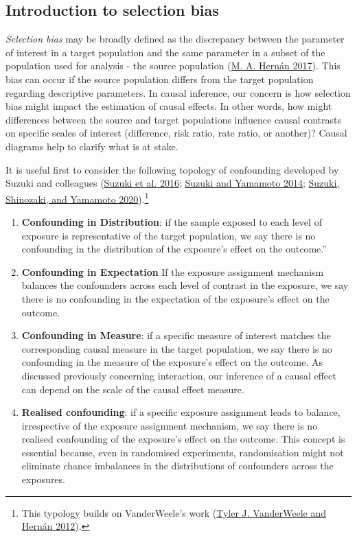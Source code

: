 \documentclass[
  singlecolumn]{report}
\begin{document}
\hypertarget{introduction-to-selection-bias}{%
\subsection{Introduction to selection
bias}\label{introduction-to-selection-bias}}

\emph{Selection bias} may be broadly defined as the discrepancy between
the parameter of interest in a target population and the same parameter
in a subset of the population used for analysis - the source population
(\protect\hyperlink{ref-hernuxe1n2017}{M. A. Hernán 2017}). This bias
can occur if the source population differs from the target population
regarding descriptive parameters. In causal inference, our concern is
how selection bias might impact the estimation of causal effects. In
other words, how might differences between the source and target
populations influence causal contrasts on specific scales of interest
(difference, risk ratio, rate ratio, or another)? Causal diagrams help
to clarify what is at stake.

It is useful first to consider the following topology of confounding
developed by Suzuki and colleagues
(\protect\hyperlink{ref-suzuki2016}{Suzuki et al. 2016};
\protect\hyperlink{ref-suzuki2014}{Suzuki and Yamamoto 2014};
\protect\hyperlink{ref-suzuki2020}{Suzuki, Shinozaki, and Yamamoto
2020}).\footnote{This typology builds on VanderWeele's work
  (\protect\hyperlink{ref-vanderweele2012}{Tyler J. VanderWeele and
  Hernán 2012}).}

\begin{enumerate}
\def\labelenumi{\arabic{enumi}.}
\item
  \textbf{Confounding in Distribution}: if the sample exposed to each
  level of exposure is representative of the target population, we say
  there is no confounding in the distribution of the exposure's effect
  on the outcome.''
\item
  \textbf{Confounding in Expectation} If the exposure assignment
  mechanism balances the confounders across each level of contrast in
  the exposure, we say there is no confounding in the expectation of the
  exposure's effect on the outcome.
\item
  \textbf{Confounding in Measure}: if a specific measure of interest
  matches the corresponding causal measure in the target population, we
  say there is no confounding in the measure of the exposure's effect on
  the outcome. As discussed previously concerning interaction, our
  inference of a causal effect can depend on the scale of the causal
  effect measure.
\item
  \textbf{Realised confounding}: if a specific exposure assignment leads
  to balance, irrespective of the exposure assignment mechanism, we say
  there is no realised confounding of the exposure's effect on the
  outcome. This concept is essential because, even in randomised
  experiments, randomisation might not eliminate chance imbalances in
  the distributions of confounders across the exposures.
\end{enumerate}
\end{document}
